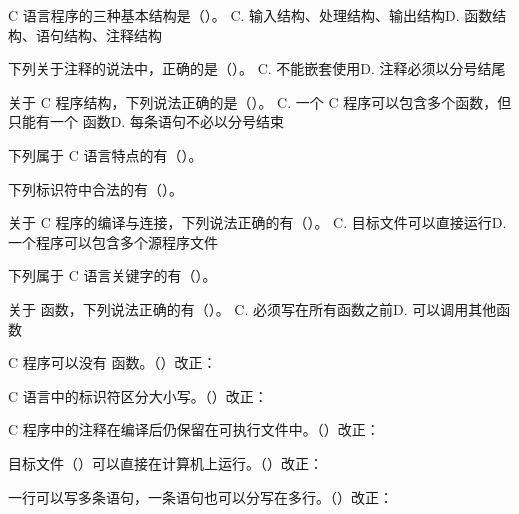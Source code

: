 \documentclass[a4paper,11pt]{article}
\begin{document}
\q C 语言程序的三种基本结构是（\quad）。
{C. 输入结构、处理结构、输出结构}{D. 函数结构、语句结构、注释结构}

\q 下列关于注释的说法中，正确的是（\quad）。
{C.  不能嵌套使用}{D. 注释必须以分号结尾}

\q 关于 C 程序结构，下列说法正确的是（\quad）。
{C. 一个 C 程序可以包含多个函数，但只能有一个  函数}{D. 每条语句不必以分号结束}


\q 下列属于 C 语言特点的有（\quad）。

\q 下列标识符中合法的有（\quad）。

\q 关于 C 程序的编译与连接，下列说法正确的有（\quad）。
{C. 目标文件可以直接运行}{D. 一个程序可以包含多个源程序文件}

\q 下列属于 C 语言关键字的有（\quad）。

\q 关于  函数，下列说法正确的有（\quad）。
{C.  必须写在所有函数之前}{D.  可以调用其他函数}


\q C 程序可以没有  函数。\quad（\quad）\quad 改正：\fixblank

\q C 语言中的标识符区分大小写。\quad（\quad）\quad 改正：\fixblank

\q C 程序中的注释在编译后仍保留在可执行文件中。\quad（\quad）\quad 改正：\fixblank

\q 目标文件（）可以直接在计算机上运行。\quad（\quad）\quad 改正：\fixblank

\q 一行可以写多条语句，一条语句也可以分写在多行。\quad（\quad）\quad 改正：\fixblank

\end{document}
